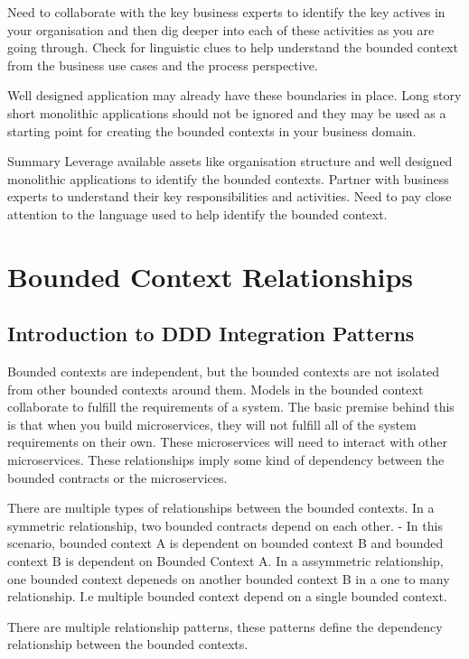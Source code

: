 Need to collaborate with the key business experts to identify the key actives in your organisation and then dig deeper into each of these activities as you are going through.
Check for linguistic clues to help understand the bounded context from the business use cases and the process perspective.

Well designed application may already have these boundaries in place.
Long story short monolithic applications should not be ignored and they may be used as a starting point for creating the bounded contexts in your business domain.

Summary
Leverage available assets like organisation structure and well designed monolithic applications to identify the bounded contexts.
Partner with business experts to understand their key responsibilities and activities.
Need to pay close attention to the language used to help identify the bounded context.

\chapter{Bounded Context Relationships}

\section{Introduction to DDD Integration Patterns}
Bounded contexts are independent, but the bounded contexts are not isolated from other bounded contexts around them.
Models in the bounded context collaborate to fulfill the requirements of a system.
The basic premise behind this is that when you build microservices, they will not fulfill all of the system requirements on their own.
These microservices will need to interact with other microservices.
These relationships imply some kind of dependency between the bounded contracts or the microservices.

There are multiple types of relationships between the bounded contexts.
In a symmetric relationship, two bounded contracts depend on each other.
- In this scenario, bounded context A is dependent on bounded context B and bounded context B is dependent on Bounded Context A.
In a assymmetric relationship, one bounded context depeneds on another bounded context B in a one to many relationship. I.e multiple bounded context depend on a single bounded context.

There are multiple relationship patterns, these patterns define the dependency relationship between the bounded contexts.

